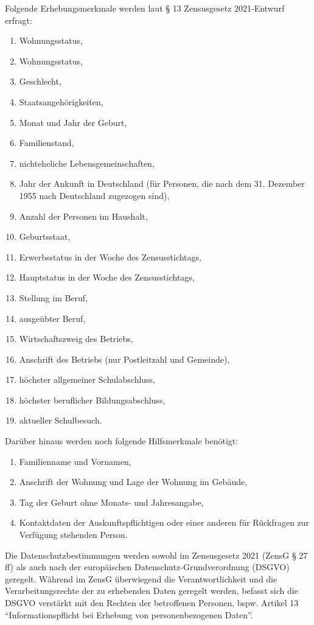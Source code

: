 Folgende Erhebungsmerkmale werden laut § 13 Zensusgesetz 2021-Entwurf erfragt:
\setlength{\parskip}{1pt}
\begin{enumerate}[label=\arabic*.]
    \item Wohnungsstatus,
    \item Wohnungsstatus,
    \item Geschlecht,
    \item Staatsangehörigkeiten,
    \item Monat und Jahr der Geburt,
    \item Familienstand,
    \item nichteheliche Lebensgemeinschaften,
    \item Jahr der Ankunft in Deutschland (für Personen, die nach dem 31. Dezember 1955 nach Deutschland zugezogen sind),
    \item Anzahl der Personen im Haushalt,
    \item Geburtsstaat,
    \item Erwerbsstatus in der Woche des Zensusstichtags,
    \item Hauptstatus in der Woche des Zensusstichtags,
    \item Stellung im Beruf,
    \item ausgeübter Beruf,
    \item Wirtschaftszweig des Betriebs,
    \item Anschrift des Betriebs (nur Postleitzahl und Gemeinde),
    \item höchster allgemeiner Schulabschluss,
    \item höchster beruflicher Bildungsabschluss,
    \item aktueller Schulbesuch.
\end{enumerate}
\setlength{\parskip}{\baselineskip}
Darüber hinaus werden noch folgende Hilfsmerkmale benötigt:
\setlength{\parskip}{1pt}
\begin{enumerate}[label=\arabic*.]
    \item Familienname und Vornamen,
    \item Anschrift der Wohnung und Lage der Wohnung im Gebäude,
    \item Tag der Geburt ohne Monats- und Jahresangabe,
    \item Kontaktdaten der Auskunftspflichtigen oder einer anderen für Rückfragen zur Verfügung stehenden Person.
\end{enumerate}
\setlength{\parskip}{\baselineskip}
Die Datenschutzbestimmungen werden sowohl im Zensusgesetz 2021 (ZensG § 27 ff) als auch nach der europäischen Datenschutz-Grundverordnung (DSGVO) geregelt. Während im ZensG überwiegend die Verantwortlichkeit und die Verarbeitungsrechte der zu erhebenden Daten geregelt werden, befasst sich die DSGVO verstärkt mit den Rechten der betroffenen Personen, bspw. Artikel 13 ``Informationspflicht bei Erhebung von personenbezogenen Daten''.\par


